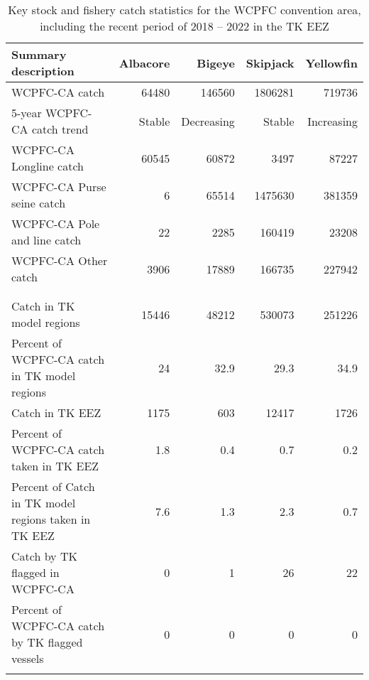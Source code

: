 \begin{longtable}{lrrrr}
\caption{Key stock and fishery catch statistics for the WCPFC convention area, including the recent period of 2018 -- 2022 in the TK EEZ} \\ 
  \hline
Summary description & Albacore & Bigeye & Skipjack & Yellowfin \\ 
  \hline
WCPFC-CA catch & 64480 & 146560 & 1806281 & 719736 \\ 
  5-year WCPFC-CA catch trend & Stable & Decreasing & Stable & Increasing \\ 
  WCPFC-CA Longline catch & 60545 & 60872 & 3497 & 87227 \\ 
  WCPFC-CA Purse seine catch & 6 & 65514 & 1475630 & 381359 \\ 
  WCPFC-CA Pole and line catch & 22 & 2285 & 160419 & 23208 \\ 
  WCPFC-CA Other catch & 3906 & 17889 & 166735 & 227942 \\ 
   &  &  &  &  \\ 
   &  &  &  &  \\ 
   \hline
Catch in TK model regions & 15446 & 48212 & 530073 & 251226 \\ 
  Percent of WCPFC-CA catch in TK model regions & 24 & 32.9 & 29.3 & 34.9 \\ 
  Catch in TK EEZ & 1175 & 603 & 12417 & 1726 \\ 
  Percent of WCPFC-CA catch taken in TK EEZ & 1.8 & 0.4 & 0.7 & 0.2 \\ 
  Percent of Catch in TK model regions taken in TK EEZ & 7.6 & 1.3 & 2.3 & 0.7 \\ 
  Catch by TK flagged in WCPFC-CA & 0 & 1 & 26 & 22 \\ 
  Percent of WCPFC-CA catch by TK flagged vessels & 0 & 0 & 0 & 0 \\ 
  \hline
\label{cat_sum_tab}
\end{longtable}
